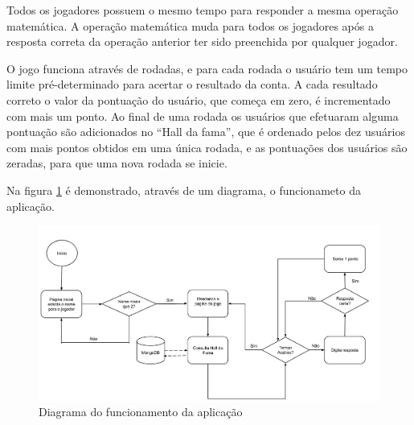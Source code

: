 Todos os jogadores possuem o mesmo tempo para responder a mesma operação matemática. A operação matemática muda para todos os jogadores após a resposta correta da operação anterior ter sido preenchida por qualquer jogador.

O jogo funciona através de rodadas, e para cada rodada o usuário tem um tempo limite pré-determinado para acertar o resultado da conta. A cada resultado correto o valor da pontuação do usuário, que começa em zero, é incrementado com mais um ponto. Ao final de uma rodada os usuários que efetuaram alguma pontuação são adicionados no ``Hall da fama'', que é ordenado pelos dez usuários com mais pontos obtidos em uma única rodada, e as pontuações dos usuários são zeradas, para que uma nova rodada se inicie. 

Na figura \ref{fig: Diagrama do funcionamento da aplicação} é demonstrado, através de um diagrama, o funcionameto da aplicação. 

    \begin{figure}[htb]
    \centering
    \includegraphics[scale=0.30]{images/func_mr.png}
    \caption{Diagrama do funcionamento da aplicação}
    \label{fig: Diagrama do funcionamento da aplicação}
    \end{figure}

